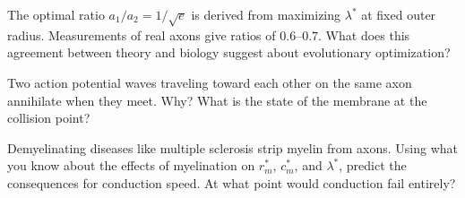 \begin{conceptquestions}
  \item The optimal ratio $a_1/a_2 = 1/\sqrt{e}$ is derived from maximizing $\lambda^*$ at fixed outer radius. Measurements of real axons give ratios of $0.6$--$0.7$. What does this agreement between theory and biology suggest about evolutionary optimization?

  \item Two action potential waves traveling toward each other on the same axon annihilate when they meet. Why? What is the state of the membrane at the collision point?

  \item Demyelinating diseases like multiple sclerosis strip myelin from axons. Using what you know about the effects of myelination on $r_m^*$, $c_m^*$, and $\lambda^*$, predict the consequences for conduction speed. At what point would conduction fail entirely?
\end{conceptquestions}

